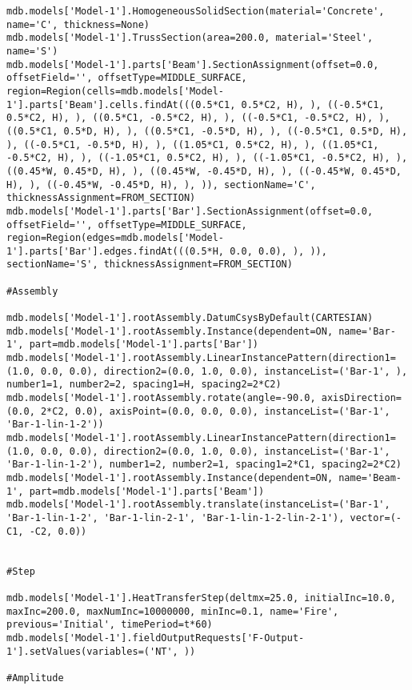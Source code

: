 \documentclass[12pt, letterpaper, oneside]{report}
\begin{document}
\begin{lstlisting}[frame=none]
mdb.models['Model-1'].HomogeneousSolidSection(material='Concrete', name='C', thickness=None)
mdb.models['Model-1'].TrussSection(area=200.0, material='Steel', name='S')
mdb.models['Model-1'].parts['Beam'].SectionAssignment(offset=0.0, offsetField='', offsetType=MIDDLE_SURFACE, region=Region(cells=mdb.models['Model-1'].parts['Beam'].cells.findAt(((0.5*C1, 0.5*C2, H), ), ((-0.5*C1, 0.5*C2, H), ), ((0.5*C1, -0.5*C2, H), ), ((-0.5*C1, -0.5*C2, H), ), ((0.5*C1, 0.5*D, H), ), ((0.5*C1, -0.5*D, H), ), ((-0.5*C1, 0.5*D, H), ), ((-0.5*C1, -0.5*D, H), ), ((1.05*C1, 0.5*C2, H), ), ((1.05*C1, -0.5*C2, H), ), ((-1.05*C1, 0.5*C2, H), ), ((-1.05*C1, -0.5*C2, H), ), ((0.45*W, 0.45*D, H), ), ((0.45*W, -0.45*D, H), ), ((-0.45*W, 0.45*D, H), ), ((-0.45*W, -0.45*D, H), ), )), sectionName='C', thicknessAssignment=FROM_SECTION)
mdb.models['Model-1'].parts['Bar'].SectionAssignment(offset=0.0, offsetField='', offsetType=MIDDLE_SURFACE, region=Region(edges=mdb.models['Model-1'].parts['Bar'].edges.findAt(((0.5*H, 0.0, 0.0), ), )), sectionName='S', thicknessAssignment=FROM_SECTION)

#Assembly

mdb.models['Model-1'].rootAssembly.DatumCsysByDefault(CARTESIAN)
mdb.models['Model-1'].rootAssembly.Instance(dependent=ON, name='Bar-1', part=mdb.models['Model-1'].parts['Bar'])
mdb.models['Model-1'].rootAssembly.LinearInstancePattern(direction1=(1.0, 0.0, 0.0), direction2=(0.0, 1.0, 0.0), instanceList=('Bar-1', ), number1=1, number2=2, spacing1=H, spacing2=2*C2)
mdb.models['Model-1'].rootAssembly.rotate(angle=-90.0, axisDirection=(0.0, 2*C2, 0.0), axisPoint=(0.0, 0.0, 0.0), instanceList=('Bar-1', 'Bar-1-lin-1-2'))
mdb.models['Model-1'].rootAssembly.LinearInstancePattern(direction1=(1.0, 0.0, 0.0), direction2=(0.0, 1.0, 0.0), instanceList=('Bar-1', 'Bar-1-lin-1-2'), number1=2, number2=1, spacing1=2*C1, spacing2=2*C2)
mdb.models['Model-1'].rootAssembly.Instance(dependent=ON, name='Beam-1', part=mdb.models['Model-1'].parts['Beam'])
mdb.models['Model-1'].rootAssembly.translate(instanceList=('Bar-1', 'Bar-1-lin-1-2', 'Bar-1-lin-2-1', 'Bar-1-lin-1-2-lin-2-1'), vector=(-C1, -C2, 0.0))


#Step

mdb.models['Model-1'].HeatTransferStep(deltmx=25.0, initialInc=10.0, maxInc=200.0, maxNumInc=10000000, minInc=0.1, name='Fire', previous='Initial', timePeriod=t*60)
mdb.models['Model-1'].fieldOutputRequests['F-Output-1'].setValues(variables=('NT', ))

#Amplitude


\end{lstlisting}
\end{document}
